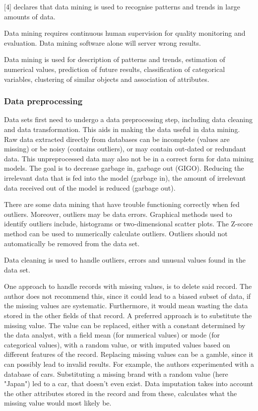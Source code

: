\textcite{DataMiningAndPredictiveAnalytics}[4] declares that data mining is used to recognise patterns and trends in large amounts of data.

Data mining requires continuous human supervision for quality monitoring and evaluation. Data mining software alone will server wrong results.

Data mining is used for description of patterns and trends, estimation of numerical values, prediction of future results, classification of categorical variables, clustering of similar objects and association of attributes.


\subsubsection{Data preprocessing}
Data sets first need to undergo a data preprocessing step, including data cleaning and data transformation. This aids in making the data useful in data mining. Raw data extracted directly from databases can be incomplete (values are missing) or be noisy (contains outliers), or may contain out-dated or redundant data. This unpreprocessed data may also not be in a correct form for data mining models. The goal is to decrease garbage in, garbage out (GIGO). Reducing the irrelevant data that is fed into the model (garbage in), the amount of irrelevant data received out of the model is reduced (garbage out).

There are some data mining that have trouble functioning correctly when fed outliers. Moreover, outliers may be data errors. Graphical methods used to identify outliers include, histograms or two-dimensional scatter plots.
The Z-score method can be used to numerically calculate outliers. Outliers should not automatically be removed from the data set.

Data cleaning is used to handle outliers, errors and unusual values found in the data set.

One approach to handle records with missing values, is to delete said record. The author does not recommend this, since it could lead to a biased subset of data, if the missing values are systematic. Furthermore, it would mean wasting the data stored in the other fields of that record. A preferred approach is to substitute the missing value. The value can be replaced, either with a constant determined by the data analyst, with a field mean (for numerical values) or mode (for categorical values), with a random value, or with imputed values based on different features of the record. Replacing missing values can be a gamble, since it can possibly lead to invalid results. For example, the authors experimented with a database of cars. Substituting a missing brand with a random value (here "Japan") led to a car, that doesn't even exist. Data imputation takes into account the other attributes stored in the record and from these, calculates what the missing value would most likely be.

